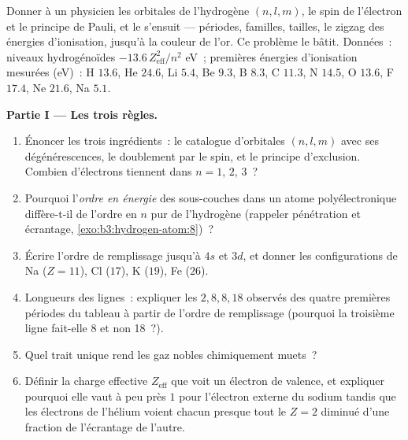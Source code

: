 \begin{problem}\label{pb:b3:identical-particles:1}
Donner à un physicien les orbitales de l'hydrogène $(n, l, m)$, le
spin de l'électron et le principe de Pauli, et le 
s'ensuit --- périodes, familles, tailles, le zigzag des énergies
d'ionisation, jusqu'à la couleur de l'or. Ce problème le bâtit.
Données~: niveaux hydrogénoïdes $-13.6\,Z_{\text{eff}}^2/n^2$ eV~;
premières énergies d'ionisation mesurées (eV)~: H $13.6$, He $24.6$,
Li $5.4$, Be $9.3$, B $8.3$, C $11.3$, N $14.5$, O $13.6$, F $17.4$,
Ne $21.6$, Na $5.1$.

\medskip\noindent\textbf{Partie I --- Les trois règles.}
\begin{enumerate}
  \item Énoncer les trois ingrédients~: le catalogue d'orbitales
        $(n, l, m)$ avec ses dégénérescences, le doublement par le
        spin, et le principe d'exclusion. Combien d'électrons tiennent
        dans $n = 1$, $2$, $3$~?
  \item Pourquoi l'\emph{ordre en énergie} des sous-couches dans un
        atome polyélectronique diffère-t-il de l'ordre en $n$ pur de
        l'hydrogène (rappeler pénétration et écrantage,
        \cref{exo:b3:hydrogen-atom:8})~?
  \item Écrire l'ordre de remplissage jusqu'à $4s$ et $3d$, et donner
        les configurations de Na ($Z = 11$), Cl ($17$), K ($19$),
        Fe ($26$).
  \item Longueurs des lignes~: expliquer les $2, 8, 8, 18$ observés
        des quatre premières périodes du tableau à partir de l'ordre
        de remplissage (pourquoi la troisième ligne fait-elle 8 et non
        18~?).
  \item Quel trait unique rend les gaz nobles chimiquement muets~?
  \item Définir la charge effective $Z_{\text{eff}}$ que voit un
        électron de valence, et expliquer pourquoi elle vaut à peu
        près $1$ pour l'électron externe du sodium tandis que les
        électrons de l'hélium voient chacun presque tout le $Z = 2$
        diminué d'une fraction de l'écrantage de l'autre.
\end{enumerate}


\end{problem}
